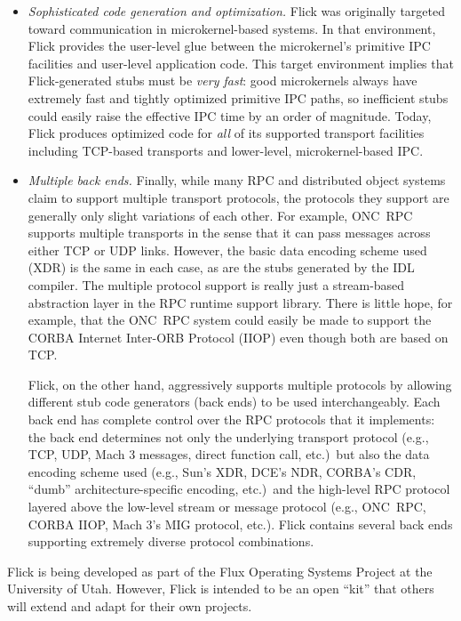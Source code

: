 \begin{itemize}
  \item \emph{Sophisticated code generation and optimization.}
  Flick was originally targeted toward communication in microkernel-based
  systems.  In that environment, Flick provides the user-level glue between the
  microkernel's primitive IPC facilities and user-level application code.  This
  target environment implies that Flick-generated stubs must be \emph{very
  fast}: good microkernels always have extremely fast and tightly optimized
  primitive IPC paths, so inefficient stubs could easily raise the effective
  IPC time by an order of magnitude.  Today, Flick produces optimized code for
  \emph{all} of its supported transport facilities including TCP-based
  transports and lower-level, microkernel-based IPC\@.

  \item \emph{Multiple back ends.}
  Finally, while many RPC and distributed object systems claim to support
  multiple transport protocols, the protocols they support are generally
  only slight variations of each other.  For example, ONC~RPC supports multiple
  transports in the sense that it can pass messages across either TCP or UDP
  links.  However, the basic data encoding scheme used (XDR) is the same in
  each case, as are the stubs generated by the IDL compiler.  The multiple
  protocol support is really just a stream-based abstraction layer in the RPC
  runtime support library.  There is little hope, for example, that the ONC~RPC
  system could easily be made to support the CORBA Internet Inter-ORB Protocol
  (IIOP) even though both are based on TCP\@.

  Flick, on the other hand, aggressively supports multiple protocols by
  allowing different stub code generators (back ends) to be used
  interchangeably.  Each back end has complete control over the RPC protocols
  that it implements: the back end determines not only the underlying transport
  protocol (e.g., TCP, UDP, Mach 3 messages, direct function call, etc.)\ but
  also the data encoding scheme used (e.g., Sun's XDR, DCE's NDR, CORBA's CDR,
  ``dumb'' architecture-specific encoding, etc.)\ and the high-level RPC
  protocol layered above the low-level stream or message protocol (e.g.,
  ONC~RPC, CORBA IIOP, Mach 3's MIG protocol, etc.).  Flick contains several
  back ends supporting extremely diverse protocol combinations.
\end{itemize}

Flick is being developed as part of the Flux Operating Systems Project at the
University of Utah.  However, Flick is intended to be an open ``kit'' that
others will extend and adapt for their own projects.





